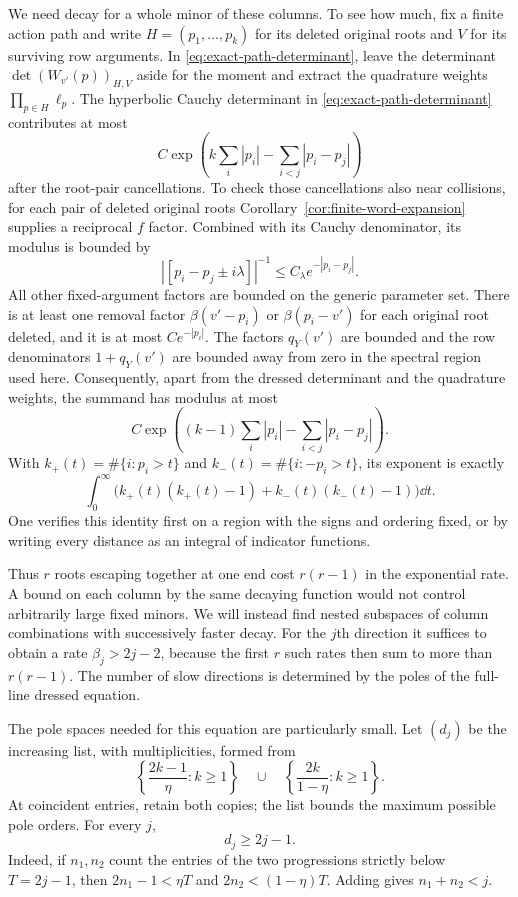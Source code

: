 We need decay for a whole minor of these columns.  To see how much,
fix a finite action path and write $H=(p_1,\ldots,p_k)$ for its deleted
original roots and $V$ for its surviving row arguments.  In
\eqref{eq:exact-path-determinant}, leave the determinant
$\det(W_{v'}(p))_{H,V}$ aside for the moment and extract the
quadrature weights $\prod_{p\in H}\ell_p$.
The hyperbolic Cauchy determinant in
\eqref{eq:exact-path-determinant} contributes at most
\[
 C\exp\left(k\sum_i|p_i|-\sum_{i<j}|p_i-p_j|\right)
\]
after the root-pair cancellations.  To check those cancellations
also near collisions, for each pair of deleted original roots
Corollary~\ref{cor:finite-word-expansion} supplies a reciprocal
$f$ factor.  Combined with its Cauchy denominator, its modulus
is bounded by
\[
 |[p_i-p_j\pm i\lambda]|^{-1}
       \le C_\lambda e^{-|p_i-p_j|}.
\]
All other fixed-argument factors are bounded on the generic
parameter set.  There is at least one removal factor
$\beta(v'-p_i)$ or $\beta(p_i-v')$ for each original root
deleted, and it is at most $Ce^{-|p_i|}$.
The factors $q_Y(v')$ are bounded and the row denominators
$1+q_Y(v')$ are bounded away from zero in the spectral region
used here.  Consequently, apart from the dressed determinant and the quadrature
weights, the summand has modulus at most
\[
 C\exp\left((k-1)\sum_i|p_i|
                         -\sum_{i<j}|p_i-p_j|\right).
\]
With $k_+(t)=\#\{i:p_i>t\}$ and
$k_-(t)=\#\{i:-p_i>t\}$, its exponent is exactly
\begin{equation}\label{eq:Cauchy-tail-cost}
 \int_0^\infty
 \bigl(k_+(t)(k_+(t)-1)+k_-(t)(k_-(t)-1)\bigr)\dd t.
\end{equation}
One verifies this identity first on a region with the signs and
ordering fixed, or by writing every distance as an integral of
indicator functions.

Thus $r$ roots escaping together at one end cost $r(r-1)$ in the
exponential rate.  A bound on each column by the same decaying function
would not control arbitrarily large fixed minors.  We will instead find
nested subspaces of column combinations with successively faster decay.
For the $j$th direction it suffices to obtain a rate
$\beta_j>2j-2$, because the first $r$ such rates then sum to more than
$r(r-1)$.  The number of slow directions is determined by the poles of
the full-line dressed equation.

The pole spaces needed for this equation are particularly small.
Let $(d_j)$ be the increasing list, with multiplicities, formed
from
\begin{equation}\label{eq:decay-pole-list}
 \left\{\frac{2k-1}{\eta}:k\ge1\right\}
 \quad\cup\quad
 \left\{\frac{2k}{1-\eta}:k\ge1\right\}.
\end{equation}
At coincident entries, retain both copies; the list bounds the
maximum possible pole orders.  For every $j$,
\begin{equation}\label{eq:pole-count}
 d_j\ge2j-1.
\end{equation}
Indeed, if $n_1,n_2$ count the entries of the two progressions
strictly below $T=2j-1$, then
$2n_1-1<\eta T$ and $2n_2<(1-\eta)T$.
Adding gives $n_1+n_2<j$.

